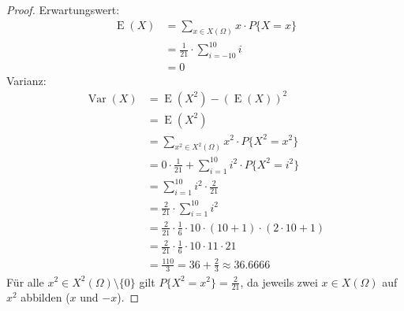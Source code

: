 \documentclass[a4paper]{scrartcl}
\newcommand{\e}{\operatorname{E}}
\newcommand{\var}{\operatorname{Var}}
\begin{document}
\begin{enumerate}[label=\bfseries\arabic*.]
\begin{proof}
            Erwartungswert:
            \begin{equation*}
                \begin{split}
                    \e(X) &= \sum_{x \in X(\Omega)} x \cdot P\{X = x\} \\
                          &= \frac{1}{21} \cdot \sum_{i=-10}^{10} i \\
                          &= 0
                \end{split}
            \end{equation*}
            Varianz:
            \begin{equation*}
                \begin{split}
                    \var(X) &= \e(X^2) - (\e(X))^2 \\
                            &= \e(X^2) \\
                            &= \sum_{x^2 \in X^2(\Omega)} x^2 \cdot P\{X^2 = x^2\} \\
                            &= 0 \cdot \frac{1}{21} + \sum_{i=1}^{10} i^2 \cdot P\{X^2 = i^2\} \\
                            &= \sum_{i=1}^{10} i^2 \cdot \frac{2}{21} \\
                            &= \frac{2}{21} \cdot \sum_{i=1}^{10} i^2 \\
                            &= \frac{2}{21} \cdot \frac{1}{6} \cdot 10 \cdot
                               (10 + 1) \cdot (2 \cdot 10 + 1) \\
                            &= \frac{2}{21} \cdot \frac{1}{6} \cdot 10 \cdot 11
                               \cdot 21 \\
                            &= \frac{110}{3} = 36 + \frac{2}{3}
                               \approx \num{36,6666}
                \end{split}
            \end{equation*}
            Für alle $x^2 \in X^2(\Omega) \setminus \{0\}$ gilt
            $P\{X^2 = x^2\} = \frac{2}{21}$, da jeweils zwei $x \in X(\Omega)$
            auf $x^2$ abbilden ($x$ und $-x$).
        \end{proof}


\end{enumerate}
\end{document}
